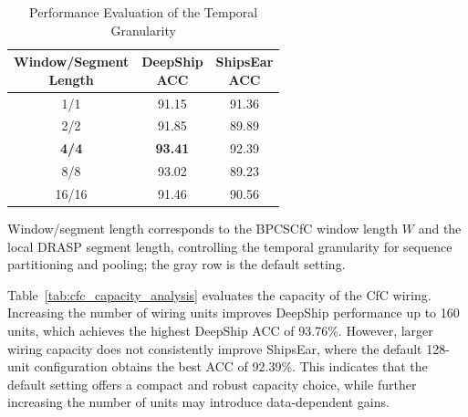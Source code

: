 ﻿\documentclass[lettersize,journal]{IEEEtran}
\begin{document}
\begin{table}[htbp]
\centering
\caption{Performance Evaluation of the Temporal Granularity}
\label{tab:temporal_granularity_analysis}
\small
\setlength{\tabcolsep}{10pt}
\begin{tabular}{c|c|c}
\toprule
\makecell{Window/Segment\\Length} &
\makecell{DeepShip\\ACC} &
\makecell{ShipsEar\\ACC} \\
\midrule
1/1   & 91.15 & 91.36 \\
2/2   & 91.85 & 89.89 \\
\rowcolor{gray!15}
\textbf{4/4} & \textbf{93.41} & 92.39 \\
8/8   & 93.02 & 89.23 \\
16/16 & 91.46 & 90.56 \\
\bottomrule
\end{tabular}
\vspace{0.5ex}
\par\footnotesize Window/segment length corresponds to the BPCSCfC window length $W$ and the local DRASP segment length, controlling the temporal granularity for sequence partitioning and pooling; the gray row is the default setting.
\end{table}

Table~\ref{tab:cfc_capacity_analysis} evaluates the capacity of the CfC wiring. Increasing the number of wiring units improves DeepShip performance up to 160 units, which achieves the highest DeepShip ACC of 93.76\%. However, larger wiring capacity does not consistently improve ShipsEar, where the default 128-unit configuration obtains the best ACC of 92.39\%. This indicates that the default setting offers a compact and robust capacity choice, while further increasing the number of units may introduce data-dependent gains.
\end{document}
